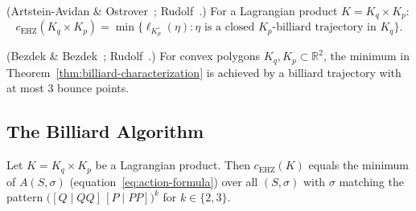 \begin{theorem}%
\label{thm:billiard-characterization}
\textup{(Artstein-Avidan \& Ostrover~\cite{AAO2014};
Rudolf~\cite{Rudolf2022}.)}
For a Lagrangian product $K = K_q \times K_p$:
\[
  c_{\mathrm{EHZ}}(K_q \times K_p)
  = \min\bigl\{ \ell_{K_p^\circ}(\eta) :
  \eta \text{ is a closed $K_p$-billiard trajectory in } K_q \bigr\}.
\]
\end{theorem}

\begin{theorem}%
\label{thm:bounce-bound}
\textup{(Bezdek \& Bezdek~\cite{BezdekBezdek2009};
Rudolf~\cite{Rudolf2022}.)}
For convex polygons $K_q, K_p \subset \mathbb{R}^2$,
the minimum in Theorem~\ref{thm:billiard-characterization}
is achieved by a billiard trajectory with at most $3$ bounce points.
\end{theorem}

\subsection{The Billiard Algorithm}\label{subsec:billiard-algorithm}

\begin{theorem}%
\label{thm:billiard-completeness}
Let $K = K_q \times K_p$ be a Lagrangian product.
Then $c_{\mathrm{EHZ}}(K)$ equals the minimum of $A(S, \sigma)$
(equation~\eqref{eq:action-formula})
over all $(S, \sigma)$ with $\sigma$ matching the pattern
$\bigl([Q \mid QQ]\,[P \mid PP]\bigr)^k$
for $k \in \{2, 3\}$.
\end{theorem}

